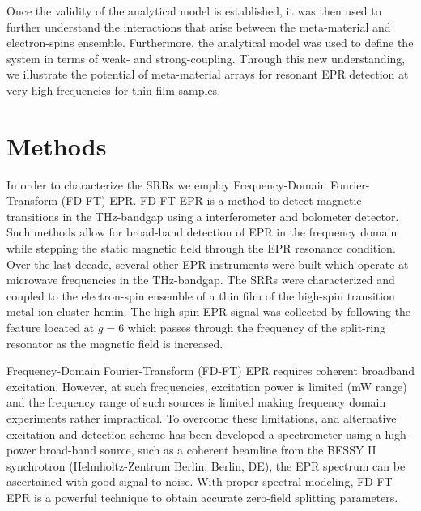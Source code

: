 Once the validity of the analytical model is established, it was then used to further understand the interactions that arise between the meta-material and electron-spins ensemble. Furthermore, the analytical model was used to define the system in terms of weak- and strong-coupling. Through this new understanding, we illustrate the potential of meta-material arrays for resonant EPR detection at very high frequencies for thin film samples. 

\section{Methods}
In order to characterize the SRRs we employ Frequency-Domain Fourier-Transform (FD-FT) EPR. FD-FT EPR is a method to detect magnetic transitions in the THz-bandgap using a interferometer and bolometer detector. \cite{Schnegg09,NEHRKORN201710} Such methods allow for broad-band detection of EPR in the frequency domain while stepping the static magnetic field through the EPR resonance condition. Over the last decade, several other EPR instruments were built which operate at microwave frequencies in the THz-bandgap. \cite{Disselhorst95,Hassan00,vanTol05,Zvyagin09,Takahashi09,C7CP07443C,Lu2017} The SRRs were characterized and coupled to the electron-spin ensemble of a thin film of the high-spin transition metal ion cluster hemin. The high-spin EPR signal was collected by following the feature located at $g=6$ which passes through the frequency of the split-ring resonator as the magnetic field is increased. 

Frequency-Domain Fourier-Transform (FD-FT) EPR requires coherent broadband excitation. However, at such frequencies, excitation power is limited (mW range) and the frequency range of such sources is limited making frequency domain experiments rather impractical. To overcome these limitations, and alternative excitation and detection scheme has been developed a spectrometer using a high-power broad-band source, such as a coherent beamline from the BESSY II synchrotron (Helmholtz-Zentrum Berlin; Berlin, DE), the EPR spectrum can be ascertained with good signal-to-noise. \cite{Nehrkorn13,NEHRKORN201710} With proper spectral modeling, FD-FT EPR is a powerful technique to obtain accurate zero-field splitting parameters. \cite{Nehrkorn15}

